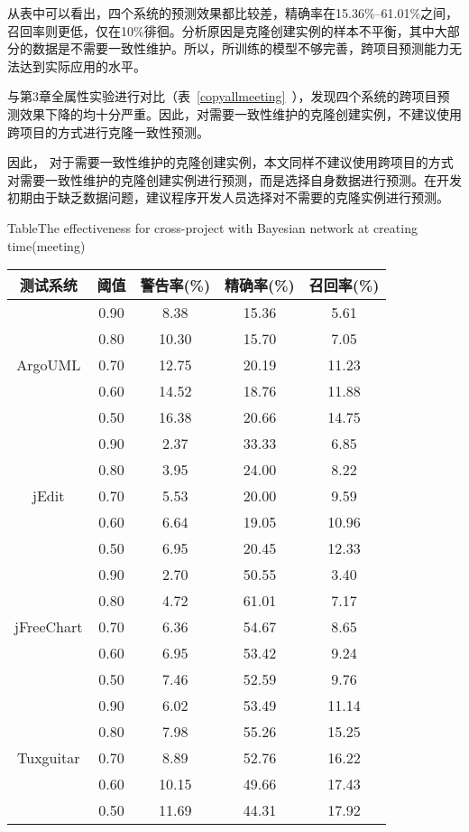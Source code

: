 从表中可以看出，四个系统的预测效果都比较差，精确率在15.36\%--61.01\%之间，召回率则更低，仅在10\%徘徊。分析原因是克隆创建实例的样本不平衡，其中大部分的数据是不需要一致性维护。所以，所训练的模型不够完善，跨项目预测能力无法达到实际应用的水平。

与第3章全属性实验进行对比（表~\ref{copyallmeeting}~），发现四个系统的跨项目预测效果下降的均十分严重。因此，对需要一致性维护的克隆创建实例，不建议使用跨项目的方式进行克隆一致性预测。

因此， 对于需要一致性维护的克隆创建实例，本文同样不建议使用跨项目的方式对需要一致性维护的克隆创建实例进行预测，而是选择自身数据进行预测。在开发初期由于缺乏数据问题，建议程序开发人员选择对不需要的克隆实例进行预测。

\begin{table}[htbp]
{Table$\!$}{The effectiveness for cross-project with Bayesian network at creating time(meeting)}
\vspace{0.5em}
\centering
\wuhao
\begin{tabular}{ccccc}
\toprule[1.5pt]
{测试系统}&{阈值}&{警告率(\%)}&{精确率(\%)}&{召回率(\%)}\\
\midrule[1pt]
\multirow{5}{*}{ArgoUML}
&0.90&	8.38&	15.36&	5.61\\
&0.80&	10.30&	15.70&	7.05\\
&0.70&	12.75&	20.19&	11.23\\
&0.60&	14.52&	18.76&	11.88\\
&0.50&	16.38&	20.66&	14.75\\
\hline
\multirow{5}{*}{jEdit}
&0.90&	2.37&	33.33&	6.85\\
&0.80&	3.95&	24.00&	8.22\\
&0.70&	5.53&	20.00&	9.59\\
&0.60&	6.64&	19.05&	10.96\\
&0.50&	6.95&	20.45&	12.33\\
\hline
\multirow{5}{*}{jFreeChart}
&0.90&	2.70&	50.55&	3.40\\
&0.80&	4.72&	61.01&	7.17\\
&0.70&	6.36&	54.67&	8.65\\
&0.60&	6.95&	53.42&	9.24\\
&0.50&	7.46&	52.59&	9.76\\
\hline
\multirow{5}{*}{Tuxguitar}
&0.90&	6.02&	53.49&	11.14\\
&0.80&	7.98&	55.26&	15.25\\
&0.70&	8.89&	52.76&	16.22\\
&0.60&	10.15&	49.66&	17.43\\
&0.50&	11.69&	44.31&	17.92\\
\bottomrule[1.5pt]
\end{tabular}
\end{table}

